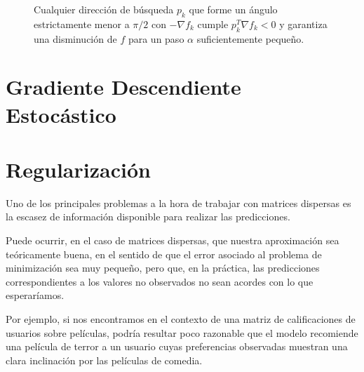 \begin{figure}[htbp]
	\caption{Cualquier dirección de búsqueda $p_k$ que forme un ángulo estrictamente menor a $\pi/2$ con $-\nabla f_k$ cumple $p_k^T \nabla f_k < 0$ y garantiza una disminución de $f$ para un paso $\alpha$ suficientemente pequeño.}
	\label{fig:descent_directions_halfspace}
\end{figure}


\section{Gradiente Descendiente Estocástico}
\section{Regularización}

Uno de los principales problemas a la hora de trabajar con matrices dispersas es la escasez de información disponible para realizar las predicciones.

Puede ocurrir, en el caso de matrices dispersas, que nuestra aproximación sea teóricamente buena, en el sentido de que el error asociado al problema de minimización sea muy pequeño, pero que, en la práctica, las predicciones correspondientes a los valores no observados no sean acordes con lo que esperaríamos.

Por ejemplo, si nos encontramos en el contexto de una matriz de calificaciones de usuarios sobre películas, podría resultar poco razonable que el modelo recomiende una película de terror a un usuario cuyas preferencias observadas muestran una clara inclinación por las películas de comedia.

